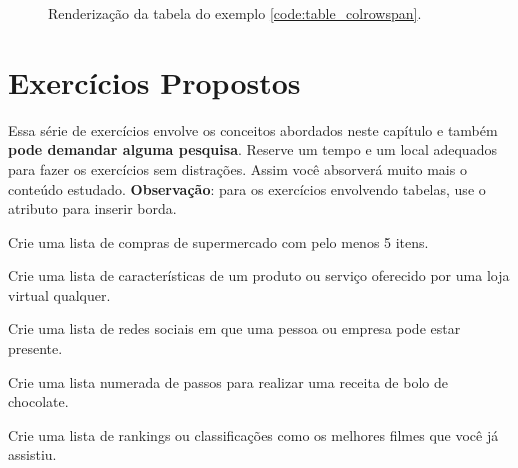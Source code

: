 \begin{figure}[ht!]    
    \caption{Renderização da tabela do exemplo \ref{code:table_colrowspan}.}
    \label{fig:table_colrowspan}
\end{figure}

\section{Exercícios Propostos}

Essa série de exercícios envolve os conceitos abordados neste capítulo e também \textbf{pode demandar alguma pesquisa}. Reserve um tempo e um local adequados para fazer os exercícios sem distrações. Assim você absorverá muito mais o conteúdo estudado. \textbf{Observação}: para os exercícios envolvendo tabelas, use o atributo para inserir borda.

\begin{exercise}
Crie uma lista de compras de supermercado com pelo menos 5 itens.
\end{exercise}

\begin{exercise}
Crie uma lista de características de um produto ou serviço oferecido por uma loja virtual qualquer.
\end{exercise}

\begin{exercise}
Crie uma lista de redes sociais em que uma pessoa ou empresa pode estar presente.
\end{exercise}

\begin{exercise}
Crie uma lista numerada de passos para realizar uma receita de bolo de chocolate.
\end{exercise}

\begin{exercise}
Crie uma lista de rankings ou classificações como os melhores filmes que você já assistiu.
\end{exercise}

